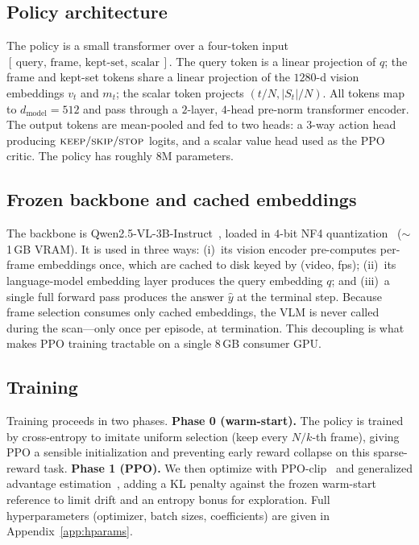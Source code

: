 \documentclass{article}
\begin{document}
\subsection{Policy architecture}
\label{sec:policy}
The policy is a small transformer over a four-token input
$[\,\text{query},\, \text{frame},\, \text{kept-set},\, \text{scalar}\,]$. The
query token is a linear projection of $q$; the frame and kept-set tokens share a
linear projection of the $1280$-d vision embeddings $v_t$ and $m_t$; the scalar
token projects $(t/N, |S_t|/N)$. All tokens map to $d_{\text{model}}=512$ and
pass through a $2$-layer, $4$-head pre-norm transformer encoder. The output
tokens are mean-pooled and fed to two heads: a $3$-way action head producing
$\textsc{keep}/\textsc{skip}/\textsc{stop}$ logits, and a scalar value head used
as the PPO critic. The policy has roughly $8$M parameters.

\subsection{Frozen backbone and cached embeddings}
\label{sec:backbone}
The backbone is Qwen2.5-VL-3B-Instruct~\citep{qwen25vl}, loaded in $4$-bit NF4
quantization~\citep{qlora} ($\sim$1\,GB VRAM). It is used in three ways:
(i)~its vision encoder pre-computes per-frame embeddings once, which are cached
to disk keyed by (video, fps); (ii)~its language-model embedding layer produces
the query embedding $q$; and (iii)~a single full forward pass produces the answer
$\hat{y}$ at the terminal step. Because frame selection consumes only cached
embeddings, the VLM is never called during the scan---only once per episode, at
termination. This decoupling is what makes PPO training tractable on a single
8\,GB consumer GPU.

\subsection{Training}
\label{sec:training}
Training proceeds in two phases.
\textbf{Phase 0 (warm-start).} The policy is trained by cross-entropy to imitate
uniform selection (keep every $N/k$-th frame), giving PPO a sensible
initialization and preventing early reward collapse on this sparse-reward task.
\textbf{Phase 1 (PPO).} We then optimize with PPO-clip~\citep{ppo} and generalized
advantage estimation~\citep{gae}, adding a KL penalty against the frozen warm-start
reference to limit drift and an entropy bonus for exploration. Full hyperparameters
(optimizer, batch sizes, coefficients) are given in Appendix~\ref{app:hparams}.
\end{document}
